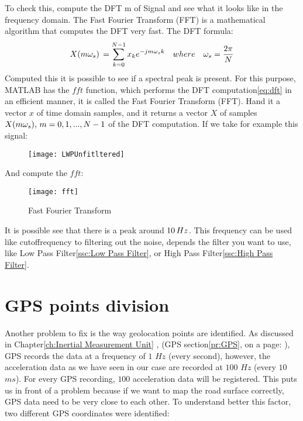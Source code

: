 \documentclass[tesi]{subfiles}
\begin{document}
To check this, compute the DFT m of Signal and see what it looks like in the frequency domain. The Fast Fourier Transform (FFT) is a mathematical algorithm that computes the DFT very fast.
The DFT formula:
\begin{equation}
X(m\omega_{s})\thinspace = \sum\limits_{k=0}^{N- 1} x_{k} e^{-jm\omega_{s}k}
\quad where \quad \omega_{s} = \dfrac{2\pi}{N}
\end{equation}\label{eq:dft}
\noindent Computed this it is possible to see if a spectral peak is present. For this purpose, MATLAB has the $fft$ function, which performs the DFT computation\ref{eq:dft} in an efficient manner, it is called the Fast Fourier Transform (FFT). Hand it a vector $x$ of time domain samples, and it returns a vector $X$ of samples $X(m\omega_{s}),\thinspace m = 0, 1,..., N-  1$ of the DFT computation.
If we take for example this signal:
\begin{figure}[H]
\centering
\texttt{[image: LWPUnfitltered]}
\end{figure}
\noindent And compute the $fft$:
\begin{figure}[H]
\centering
\texttt{[image: fft]}
\caption{Fast Fourier Transform}
\end{figure}\label{fig: Fast Fourier Transform}

It is possible see that there is a peak around $10 \thinspace Hz$. This frequency can be used like cutoffrequency to filtering out the noise, depends the filter you want to use, like Low Pass Filter\ref{ssc:Low Pass Filter}, or High Pass Filter\ref{ssc:High Pass Filter}.



\section{GPS points division} \label{sc:GPS points division}
Another problem to fix is the way geolocation points are identified.
As discussed in Chapter\ref{ch:Inertial Measurement Unit} , (GPS section\ref{pr:GPS}, on a page: \pageref{pr:GPS}), GPS records the data at a frequency of $1$ $Hz$ (every second), however, the acceleration data as we have seen in our case are recorded at $100$ $Hz$ (every $10$ $ms$). 
For every GPS recording, $100$ acceleration data will be registered. This puts us in front of a problem because if we want to map the road surface correctly, GPS data need to be very close to each other.
To understand better this factor, two different GPS coordinates were identified:
\end{document}
